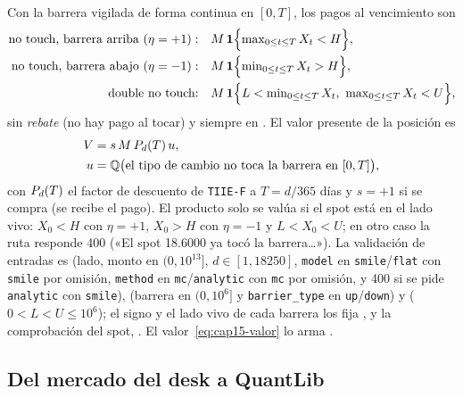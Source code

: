 Con la barrera vigilada de forma continua en $[0,T]$, los pagos al vencimiento son
\begin{equation}\label{eq:cap15-pago}
  \begin{aligned}
    \text{no touch, barrera arriba }(\eta=+1):\quad & M\,\mathbf 1\Bigl\{\textstyle\max_{0\le t\le T}X_t<H\Bigr\},\\
    \text{no touch, barrera abajo }(\eta=-1):\quad & M\,\mathbf 1\Bigl\{\textstyle\min_{0\le t\le T}X_t>H\Bigr\},\\
    \text{double no touch:}\quad & M\,\mathbf 1\Bigl\{L<\textstyle\min_{0\le t\le T}X_t,\ \max_{0\le t\le T}X_t<U\Bigr\},
  \end{aligned}
\end{equation}
sin \emph{rebate} (no hay pago al tocar) y siempre en \MXN{}. El valor presente de la posición es
\begin{equation}\label{eq:cap15-valor}
  \begin{aligned}
  V &= s\,M\,P_{d}(T)\,u,\\
  u &=\mathbb{Q}\bigl(\text{el tipo de cambio no toca la barrera en }[0,T]\bigr),
  \end{aligned}
\end{equation}
con $P_{d}(T)$ el factor de descuento de \texttt{TIIE-F} a $T=d/365$ días y $s=+1$ si se compra (se recibe el pago). El
producto solo se valúa si el spot está en el lado vivo: $X_0<H$ con $\eta=+1$, $X_0>H$ con $\eta=-1$ y $L<X_0<U$; en otro
caso la ruta responde 400 («El spot 18.6000 ya tocó la barrera…»). La validación de entradas es
 (lado, monto en $(0,10^{13}]$, $d\in[1,18250]$, \texttt{model} en
\texttt{smile}/\texttt{flat} con \texttt{smile} por omisión, \texttt{method} en \texttt{mc}/\texttt{analytic} con \texttt{mc} por
omisión, y 400 si se pide \texttt{analytic} con \texttt{smile}),
 (barrera en $(0,10^{6}]$ y \texttt{barrier\_type} en \texttt{up}/\texttt{down}) y
 ($0<L<U\le10^{6}$); el signo y el lado vivo de cada
barrera los fija , y la comprobación del spot, . El
valor~\eqref{eq:cap15-valor} lo arma .

\subsection{Del mercado del desk a QuantLib}\label{sec:cap15-mercado}

